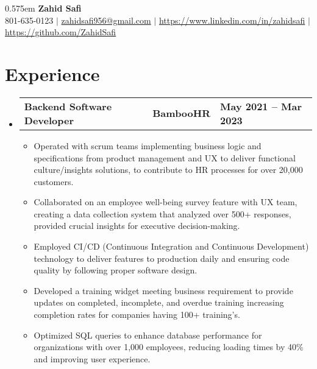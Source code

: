 \documentclass[letterpaper,11pt]{article}
\def\namespaceskip{0.575em}
\begin{document}
\begin{center}
    \spaceskip \namespaceskip \relax
  \textbf{\Huge{Zahid Safi}} \\ \vspace{1pt}
    \small 801-635-0123 $|$ \href{mailto:zahidsafi956@gmail.com}{{zahidsafi956@gmail.com}} $|$ 
    \href{https://www.linkedin.com/in/zahidsafi}{{https://www.linkedin.com/in/zahidsafi}} $|$
    \href{https://github.com/ZahidSafi}{{https://github.com/ZahidSafi}} 
\end{center}


\section{\textbf{Experience}}
\begin{itemize}[leftmargin=0.05in, label={}]
	\item{
	            \begin{tabu} {X[l] X[c] X[r]}
		            \textbf{Backend Software Developer} & \textbf{BambooHR} & \textbf{May 2021 -- Mar 2023} \\
	            \end{tabu}
	            \begin{itemize}[label=$\bullet$]
		            \item{Operated with scrum teams implementing business logic and specifications from product management and UX to deliver functional culture/insights solutions, to contribute to HR processes for
					over 20,000 customers.}
		            \item{Collaborated on an  employee well-being survey feature with UX team, creating a data collection system that analyzed over 500+ responses, provided crucial insights for executive decision-making.}
		            \item {Employed CI/CD (Continuous Integration and Continuous Development) technology to deliver features to production daily and ensuring code
					quality by following proper software design.}
		            \item{Developed a training widget meeting business requirement to provide updates on completed, incomplete, and overdue training increasing completion rates for companies having 100+ training's.}
		            \item{Optimized SQL queries to enhance database performance for organizations with over 1,000 employees, reducing loading times by 40\% and improving user experience.}
	            \end{itemize}
	      }


\end{itemize}
\end{document}
